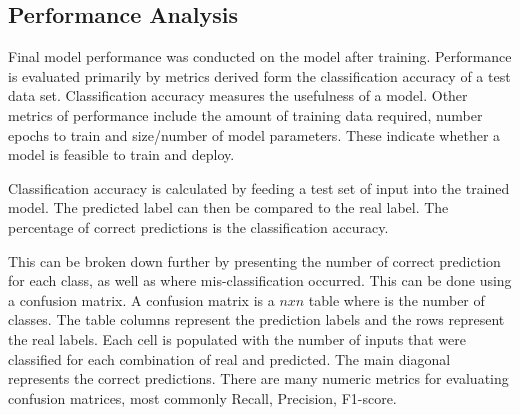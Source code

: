 \subsection{Performance Analysis}
Final model performance was conducted on the model after training. Performance is evaluated primarily by metrics derived form the classification accuracy of a test data set. Classification accuracy measures the usefulness of a model. Other metrics of performance include the amount of training data required, number epochs to train and size/number of model parameters. These indicate whether a model is feasible to train and deploy.

Classification accuracy is calculated by feeding a test set of input into the trained model. The predicted label can then be compared to the real label. The percentage of correct predictions is the classification accuracy.

This can be broken down further by presenting the number of correct prediction for each class, as well as where mis-classification occurred. This can be done using a confusion matrix. A confusion matrix is a $nxn$ table where is the number of classes. The table columns represent the prediction labels and the rows represent the real labels. Each cell is populated with the number of inputs that were classified for each combination of real and predicted. The main diagonal represents the correct predictions. There are many numeric metrics for evaluating confusion matrices, most commonly Recall, Precision, F1-score.
